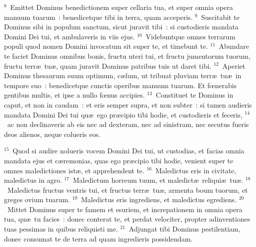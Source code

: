 ${}^{8}$~Emittet Dominus benedictionem super cellaria tua, et super omnia opera manuum tuarum~: benedicetque tibi in terra, quam acceperis.
${}^{9}$~Suscitabit te Dominus sibi in populum sanctum, sicut juravit tibi~: si custodieris mandata Domini Dei tui, et ambulaveris in viis ejus.
${}^{10}$~Videbuntque omnes terrarum populi quod nomen Domini invocatum sit super te, et timebunt te.
${}^{11}$~Abundare te faciet Dominus omnibus bonis, fructu uteri tui, et fructu jumentorum tuorum, fructu terr\ae\ tu\ae , quam juravit Dominus patribus tuis ut daret tibi.
${}^{12}$~Aperiet Dominus thesaurum suum optimum, c\ae lum, ut tribuat pluviam terr\ae\ tu\ae\ in tempore suo~: benedicetque cunctis operibus manuum tuarum. Et fœnerabis gentibus multis, et ipse a nullo fœnus accipies.
${}^{13}$~Constituet te Dominus in caput, et non in caudam~: et eris semper supra, et non subter~: si tamen audieris mandata Domini Dei tui qu\ae\ ego pr\ae cipio tibi hodie, et custodieris et feceris,
${}^{14}$~ac non declinaveris ab eis nec ad dexteram, nec ad sinistram, nec secutus fueris deos alienos, neque colueris eos.


${}^{15}$~Quod si audire nolueris vocem Domini Dei tui, ut custodias, et facias omnia mandata ejus et c\ae remonias, quas ego pr\ae cipio tibi hodie, venient super te omnes maledictiones ist\ae , et apprehendent te.
${}^{16}$~Maledictus eris in civitate, maledictus in agro.
${}^{17}$~Maledictum horreum tuum, et maledict\ae\ reliqui\ae\ tu\ae .
${}^{18}$~Maledictus fructus ventris tui, et fructus terr\ae\ tu\ae , armenta boum tuorum, et greges ovium tuarum.
${}^{19}$~Maledictus eris ingrediens, et maledictus egrediens.
${}^{20}$~Mittet Dominus super te famem et esuriem, et increpationem in omnia opera tua, qu\ae\ tu facies~: donec conterat te, et perdat velociter, propter adinventiones tuas pessimas in quibus reliquisti me.
${}^{21}$~Adjungat tibi Dominus pestilentiam, donec consumat te de terra ad quam ingredieris possidendam.


